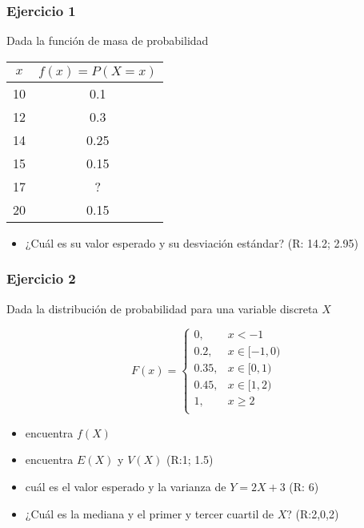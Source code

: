 \documentclass[
]{book}
\providecommand{\tightlist}{%
  \setlength{\itemsep}{0pt}\setlength{\parskip}{0pt}}
\begin{document}
\hypertarget{ejercicio-1-3}{%
\subsubsection{Ejercicio 1}\label{ejercicio-1-3}}

Dada la función de masa de probabilidad

\begin{longtable}[]{@{}cc@{}}
\toprule
\(x\) & \(f(x)=P(X=x)\) \\
\midrule
\endhead
10 & 0.1 \\
12 & 0.3 \\
14 & 0.25 \\
15 & 0.15 \\
17 & ? \\
20 & 0.15 \\
\bottomrule
\end{longtable}

\begin{itemize}
\tightlist
\item
  ¿Cuál es su valor esperado y su desviación estándar? (R: 14.2; 2.95)
\end{itemize}

\hypertarget{ejercicio-2-3}{%
\subsubsection{Ejercicio 2}\label{ejercicio-2-3}}

Dada la distribución de probabilidad para una variable discreta \(X\)

\[
    F(x)=
\begin{cases}
0, & x < -1 \\
0.2,& x \in [-1,0)\\
0.35,& x \in [0,1)\\
0.45,& x \in [1,2)\\
1,& x \geq 2\\
\end{cases}
\]

\begin{itemize}
\tightlist
\item
  encuentra \(f(X)\)
\item
  encuentra \(E(X)\) y \(V(X)\) (R:1; 1.5)
\item
  cuál es el valor esperado y la varianza de \(Y=2X+3\) (R: 6)
\item
  ¿Cuál es la mediana y el primer y tercer cuartil de \(X\)? (R:2,0,2)
\end{itemize}
\end{document}
